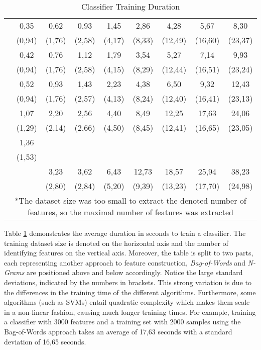 \begin{table}[H]
\begin{tabular}{c| c c c c c c c c}
					\cline{2-9}
					\vspace*{-2mm} 
					\multirow{2}{*}{100} & 0,35 & 0,62 & 0,93 &	1,45 & 2,86 & 4,28 & 5,67 & 8,30  \\
					&(0,94) & (1,76) & (2,58) & (4,17) & (8,33) & (12,49) & (16,60) & (23,37)\\
					\vspace*{-2mm} 
					\multirow{2}{*}{500} & 0,42 & 0,76 & 1,12 & 1,79 & 3,54 & 5,27 & 7,14 & 9,93 \\
					& (0,94) & (1,76) & (2,58) & (4,15) & (8,29) & (12,44) & (16,51) & (23,24)\\
					\vspace*{-2mm} 
					\multirow{2}{*}{1000}& 0,52 & 0,93 & 1,43 & 2,23 & 4,38 & 6,50 & 9,32 & 12,43\\
					& (0,94) & (1,76) & (2,57) & (4,13) & (8,24) & (12,40) & (16,41) & (23,13)\\
					\vspace*{-2mm} 
					\multirow{2}{*}{3000}& 1,07 & 2,20 & 2,56 & 4,40 & 8,49 & 12,25 & 17,63 & 24,06 \\
					&(1,29) & (2,14) & (2,66) & (4,50) & (8,45) & (12,41) & (16,65) & (23,05)\\
					\vspace*{-2mm} 
					\multirow{2}{*}{4185*}&1,36 & & & & & & & \\
					& (1,53)& & & & & & & \\
					\vspace*{-2mm} 
					\multirow{2}{*}{5000}& & 3,23 & 3,62 & 6,43 & 12,73 & 18,57 & 25,94 & 38,23 \\
					& &(2,80) & (2,84) & (5,20) & (9,39) & (13,23) & (17,70) & (24,98) \\
					\hline\hline
					\multicolumn{9}{p{1\textwidth}}{\footnotesize{*The dataset size was too small to extract the denoted number of features, so the maximal number of features was extracted}} \\
				\end{tabular}
				\caption[Classifier Duration]{Classifier Training Duration}
				\label{table:class_duration}
			\end{table}
			
			\par
			Table \ref{table:class_duration} demonstrates the average duration in seconds to train a classifier. The training dataset size is denoted on the horizontal axis and the number of identifying features on the vertical axis. Moreover, the table is split to two parts, each representing another approach to feature construction, \textit{Bag-of-Words} and \textit{N-Grams} are positioned above and below accordingly. Notice the large standard deviations, indicated by the numbers in brackets. This strong variation is due to the differences in the training time of the different algorithms. Furthermore, some algorithms (such as SVMs) entail quadratic complexity which makes them scale in a non-linear fashion, causing much longer training times. For example, training a classifier with 3000 features and a training set with 2000 samples using the Bag-of-Words approach takes an average of 17,63 seconds with a standard deviation of 16,65 seconds.
			
